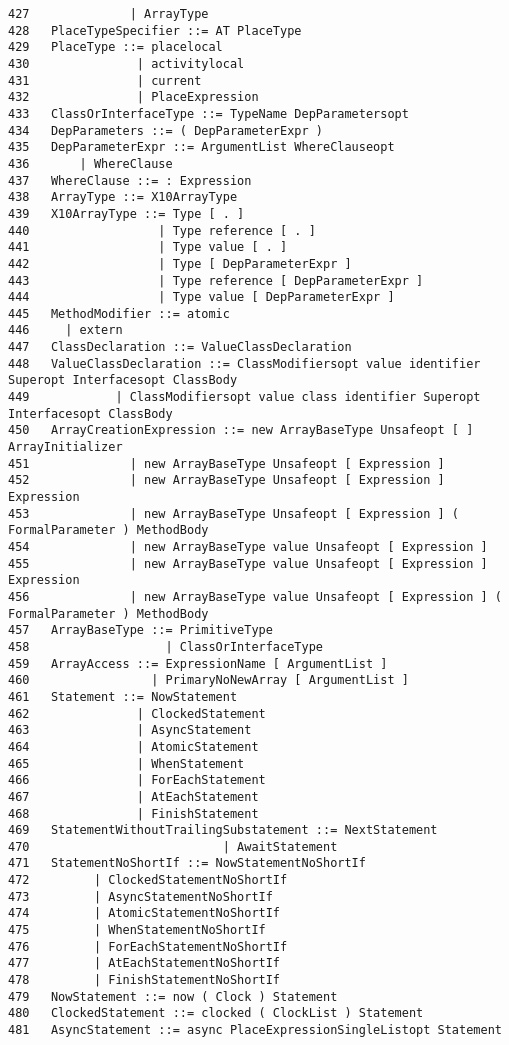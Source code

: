 {\begin{verbatim}
427              | ArrayType
428   PlaceTypeSpecifier ::= AT PlaceType
429   PlaceType ::= placelocal
430               | activitylocal
431               | current
432               | PlaceExpression
433   ClassOrInterfaceType ::= TypeName DepParametersopt
434   DepParameters ::= ( DepParameterExpr )
435   DepParameterExpr ::= ArgumentList WhereClauseopt
436       | WhereClause
437   WhereClause ::= : Expression
438   ArrayType ::= X10ArrayType
439   X10ArrayType ::= Type [ . ]
440                  | Type reference [ . ]
441                  | Type value [ . ]
442                  | Type [ DepParameterExpr ]
443                  | Type reference [ DepParameterExpr ]
444                  | Type value [ DepParameterExpr ]
445   MethodModifier ::= atomic
446     | extern
447   ClassDeclaration ::= ValueClassDeclaration
448   ValueClassDeclaration ::= ClassModifiersopt value identifier Superopt Interfacesopt ClassBody
449            | ClassModifiersopt value class identifier Superopt Interfacesopt ClassBody
450   ArrayCreationExpression ::= new ArrayBaseType Unsafeopt [ ] ArrayInitializer
451              | new ArrayBaseType Unsafeopt [ Expression ]
452              | new ArrayBaseType Unsafeopt [ Expression ] Expression
453              | new ArrayBaseType Unsafeopt [ Expression ] ( FormalParameter ) MethodBody
454              | new ArrayBaseType value Unsafeopt [ Expression ]
455              | new ArrayBaseType value Unsafeopt [ Expression ] Expression
456              | new ArrayBaseType value Unsafeopt [ Expression ] ( FormalParameter ) MethodBody
457   ArrayBaseType ::= PrimitiveType
458                   | ClassOrInterfaceType
459   ArrayAccess ::= ExpressionName [ ArgumentList ]
460                 | PrimaryNoNewArray [ ArgumentList ]
461   Statement ::= NowStatement
462               | ClockedStatement
463               | AsyncStatement
464               | AtomicStatement
465               | WhenStatement
466               | ForEachStatement
467               | AtEachStatement
468               | FinishStatement
469   StatementWithoutTrailingSubstatement ::= NextStatement
470                           | AwaitStatement
471   StatementNoShortIf ::= NowStatementNoShortIf
472         | ClockedStatementNoShortIf
473         | AsyncStatementNoShortIf
474         | AtomicStatementNoShortIf
475         | WhenStatementNoShortIf
476         | ForEachStatementNoShortIf
477         | AtEachStatementNoShortIf
478         | FinishStatementNoShortIf
479   NowStatement ::= now ( Clock ) Statement
480   ClockedStatement ::= clocked ( ClockList ) Statement
481   AsyncStatement ::= async PlaceExpressionSingleListopt Statement

\end{verbatim}}
